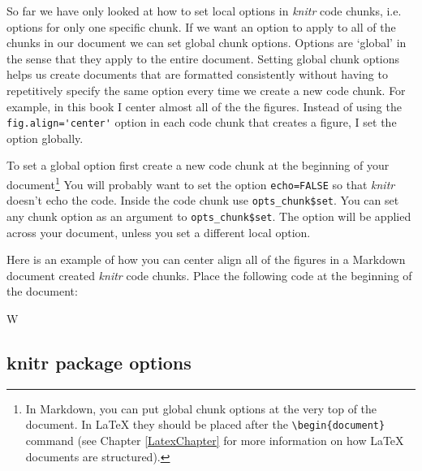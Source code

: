 \documentclass[krantz1]{krantz}
\begin{document}
So far we have only looked at how to set local options in {\emph{knitr}} code chunks, i.e. options for only one specific chunk. If we want an option to apply to all of the chunks in our document we can set global chunk options. Options are `global' in the sense that they apply to the entire document. Setting global chunk options helps us create documents that are formatted consistently without having to repetitively specify the same option every time we create a new code chunk. For example, in this book I center almost all of the the figures. Instead of using the \verb|fig.align='center'| option in each code chunk that creates a figure, I set the option globally.

To set a global option first create a new code chunk at the beginning of your document\footnote{In Markdown, you can put global chunk options at the very top of the document. In LaTeX they should be placed after the \texttt{\textbackslash{}begin\{document\}} command (see Chapter \ref{LatexChapter} for more information on how LaTeX documents are structured).} You will probably want to set the option {\tt{echo=FALSE}} so that {\emph{knitr}} doesn't echo the code. Inside the code chunk use {\tt{opts\_chunk\$set}}. You can set any chunk option as an argument to {\tt{opts\_chunk\$set}}. The option will be applied across your document, unless you set a different local option. 

Here is an example of how you can center align all of the figures in a Markdown document created {\emph{knitr}} code chunks. Place the following code at the beginning of the document:

\begin{knitrout}
    \color{fgcolor}
\end{knitrout}

\noindent W

\subsection{knitr package options}
\end{document}
